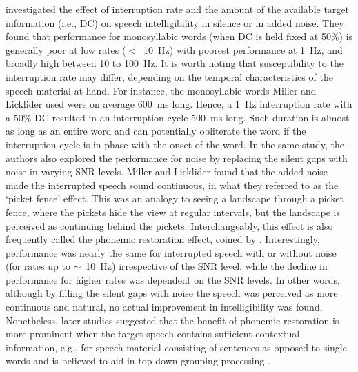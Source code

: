 \documentclass[a4paper, twoside]{templates/ociamthesis}
\begin{document}
\textcite{Miller1950} investigated the effect of interruption rate and the amount of the available target information (i.e., DC) on speech intelligibility in silence or in added noise. They found that performance for monosyllabic words (when DC is held fixed at 50\%) is generally poor at low rates (\(<\)~10~Hz) with poorest performance at 1~Hz, and broadly high between 10 to 100~Hz. It is worth noting that susceptibility to the interruption rate may differ, depending on the temporal characteristics of the speech material at hand. For instance, the monosyllabic words Miller and Licklider used were on average 600~ms long. Hence, a 1~Hz interruption rate with a 50\% DC resulted in an interruption cycle 500~ms long. Such duration is almost as long as an entire word and can potentially obliterate the word if the interruption cycle is in phase with the onset of the word. In the same study, the authors also explored the performance for noise by replacing the silent gaps with noise in varying SNR levels. Miller and Licklider found that the added noise made the interrupted speech sound continuous, in what they referred to as the `picket fence' effect. This was an analogy to seeing a landscape through a picket fence, where the pickets hide the view at regular intervals, but the landscape is perceived as continuing behind the pickets. Interchangeably, this effect is also frequently called the phonemic restoration effect, coined by \textcite{Warren1970}. Interestingly, performance was nearly the same for interrupted speech with or without noise (for rates up to \(\sim\)~10~Hz) irrespective of the SNR level, while the decline in performance for higher rates was dependent on the SNR levels. In other words, although by filling the silent gaps with noise the speech was perceived as more continuous and natural, no actual improvement in intelligibility was found. Nonetheless, later studies suggested that the benefit of phonemic restoration is more prominent when the target speech contains sufficient contextual information, e.g., for speech material consisting of sentences as opposed to single words \autocite{Bashford1992} and is believed to aid in top-down grouping processing \autocite{Saija2014}.\\
\end{document}
